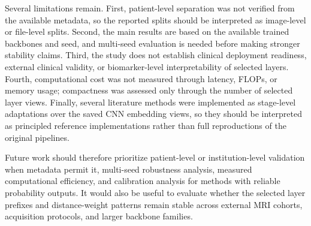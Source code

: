 \documentclass[main.tex]{subfiles}
\begin{document}
Several limitations remain. First, patient-level separation was not verified from the available metadata, so the reported splits should be interpreted as image-level or file-level splits. Second, the main results are based on the available trained backbones and seed, and multi-seed evaluation is needed before making stronger stability claims. Third, the study does not establish clinical deployment readiness, external clinical validity, or biomarker-level interpretability of selected layers. Fourth, computational cost was not measured through latency, FLOPs, or memory usage; compactness was assessed only through the number of selected layer views. Finally, several literature methods were implemented as stage-level adaptations over the saved CNN embedding views, so they should be interpreted as principled reference implementations rather than full reproductions of the original pipelines.

Future work should therefore prioritize patient-level or institution-level validation when metadata permit it, multi-seed robustness analysis, measured computational efficiency, and calibration analysis for methods with reliable probability outputs. It would also be useful to evaluate whether the selected layer prefixes and distance-weight patterns remain stable across external MRI cohorts, acquisition protocols, and larger backbone families.
\end{document}
